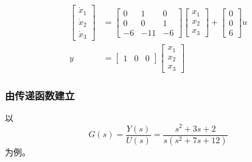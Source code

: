 \begin{align*}
    \begin{bmatrix}
        \dot{x}_1 \\
        \dot{x}_2 \\
        \dot{x}_3
    \end{bmatrix} &= \begin{bmatrix}
        0 & 1 & 0 \\
        0 & 0 & 1 \\
        -6 & -11 & -6
    \end{bmatrix} \begin{bmatrix}
        x_1 \\
        x_2 \\
        x_3
    \end{bmatrix} + \begin{bmatrix}
        0 \\
        0 \\
        6
    \end{bmatrix} u \\
    y &= \begin{bmatrix}
        1 & 0 & 0
    \end{bmatrix} \begin{bmatrix}
        x_1 \\
        x_2 \\
        x_3
    \end{bmatrix}
\end{align*}

\subsubsection{由传递函数建立}

以
\begin{equation*}
    G(s) = \frac{Y(s)}{U(s)} = \frac{s^2 + 3s + 2}{s(s^2 + 7s + 12)}
\end{equation*}
为例。


